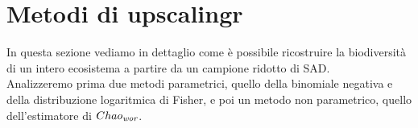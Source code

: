 \chapter{Metodi di upscalingr}\label{ch:upscaling} %
In questa sezione vediamo in dettaglio come è possibile ricostruire la biodiversità di un intero ecosistema a partire da un campione ridotto di SAD. \\
Analizzeremo prima due metodi parametrici, quello della binomiale negativa e della distribuzione logaritmica di Fisher, e poi un metodo non parametrico, quello dell'estimatore di $Chao_\emph{wor}$.



